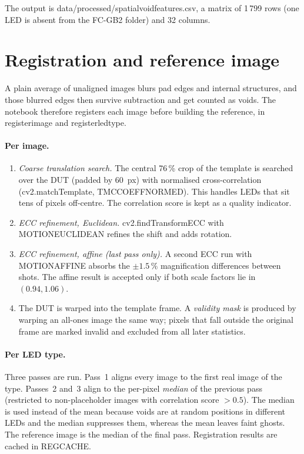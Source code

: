 \documentclass[11pt,a4paper]{article}
\newcommand{\code}[1]{{\ttfamily\def\_{\textunderscore\allowbreak}#1}}
\begin{document}
The output is \code{data/processed/spatial\_void\_features.csv}, a matrix of 1\,799 rows (one
LED is absent from the FC-GB2 folder) and 32 columns.

\section{Registration and reference image}
\label{sec:registration}

A plain average of unaligned images blurs pad edges and internal structures, and those blurred
edges then survive subtraction and get counted as voids. The notebook therefore registers each
image before building the reference, in \code{register\_image} and \code{register\_led\_type}.

\paragraph{Per image.}
\begin{enumerate}[nosep]
  \item \emph{Coarse translation search.} The central 76\,\% crop of the template is searched
        over the DUT (padded by 60~px) with normalised cross-correlation
        (\code{cv2.matchTemplate}, \code{TM\_CCOEFF\_NORMED}). This handles LEDs that sit tens of
        pixels off-centre. The correlation score is kept as a quality indicator.
  \item \emph{ECC refinement, Euclidean.} \code{cv2.findTransformECC} with
        \code{MOTION\_EUCLIDEAN} refines the shift and adds rotation.
  \item \emph{ECC refinement, affine (last pass only).} A second ECC run with
        \code{MOTION\_AFFINE} absorbs the $\pm1.5\,\%$ magnification differences between shots.
        The affine result is accepted only if both scale factors lie in $(0.94, 1.06)$.
  \item The DUT is warped into the template frame. A \emph{validity mask} is produced by
        warping an all-ones image the same way; pixels that fall outside the original frame are
        marked invalid and excluded from all later statistics.
\end{enumerate}

\paragraph{Per LED type.} Three passes are run. Pass~1 aligns every image to the first real
image of the type. Passes~2 and~3 align to the per-pixel \emph{median} of the previous pass
(restricted to non-placeholder images with correlation score $> 0.5$). The median is used
instead of the mean because voids are at random positions in different LEDs and the median
suppresses them, whereas the mean leaves faint ghosts. The reference image is the median of the
final pass. Registration results are cached in \code{\_REG\_CACHE}.
\end{document}
